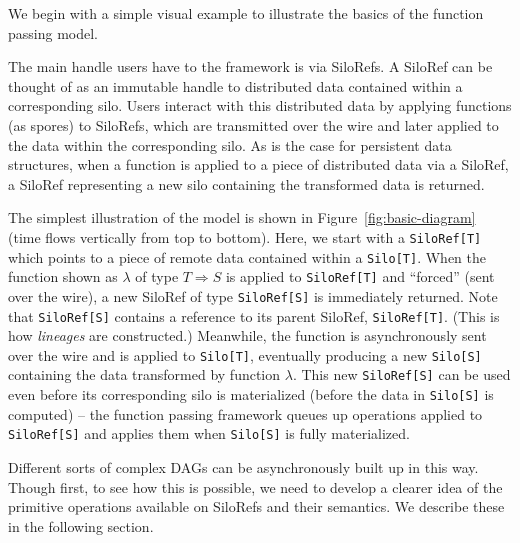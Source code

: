 \documentclass{jfp1}
\begin{document}
We begin with a simple visual example to illustrate the basics of the function
passing model. %

The main handle users have to the framework is via SiloRefs. A SiloRef can be
thought of as an immutable handle to distributed data contained within a
corresponding silo. Users interact with this distributed data by applying
functions (as spores) to SiloRefs, which are transmitted over the wire and later
applied to the data within the corresponding silo. As is the case for persistent
data structures, when a function is applied to a piece of distributed data via a
SiloRef, a SiloRef representing a new silo containing the transformed data is
returned.

The simplest illustration of the model is shown in
Figure~\ref{fig:basic-diagram} (time flows vertically from top to bottom). Here,
we start with a \verb|SiloRef[T]| which points to a piece of remote data
contained within a \verb|Silo[T]|. When the function shown as $\lambda$ of type
$T \Rightarrow S$ is applied to \verb|SiloRef[T]| and ``forced'' (sent over the
wire), a new SiloRef of type \verb|SiloRef[S]| is immediately returned. Note
that \verb|SiloRef[S]| contains a reference to its parent SiloRef,
\verb|SiloRef[T]|. (This is how {\em lineages} are constructed.) Meanwhile, the
function is asynchronously sent over the wire and is applied to \verb|Silo[T]|,
eventually producing a new \verb|Silo[S]| containing the data transformed by
function $\lambda$. This new \verb|SiloRef[S]| can be used even before its
corresponding silo is materialized (\ie before the data in \verb|Silo[S]| is
computed) – the function passing framework queues up operations applied to
\verb|SiloRef[S]| and applies them when \verb|Silo[S]| is fully materialized.

Different sorts of complex DAGs can be asynchronously built up in this way.
Though first, to see how this is possible, we need to develop a clearer idea of
the primitive operations available on SiloRefs and their semantics. We describe
these in the following section.
\end{document}
